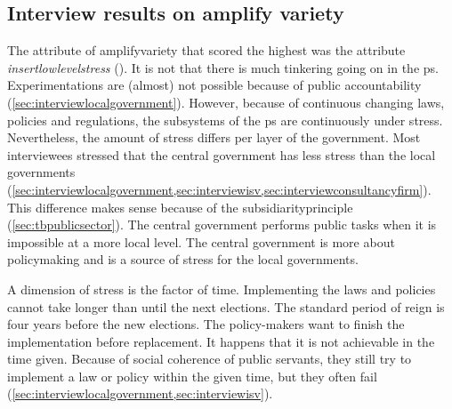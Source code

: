 \subsection{Interview results on amplify variety}
\label{sub:interviewresultsamplify}
The \gls{attribute} of \gls{amplifyvariety} that scored the highest was the \gls{attribute} \textit{\gls{insertlowlevelstress}} (). It is not that there is much tinkering going on in the \gls{ps}. Experimentations are (almost) not possible because of public accountability (\cref{sec:interviewlocalgovernment}). However, because of continuous changing laws, policies and regulations, the subsystems of the \gls{ps} are continuously under stress. Nevertheless, the amount of stress differs per layer of the government. Most interviewees stressed that the central government has less stress than the local governments (\cref{sec:interviewlocalgovernment,sec:interviewisv,sec:interviewconsultancyfirm}). This difference makes sense because of the \gls{subsidiarityprinciple} (\cref{sec:tbpublicsector}). The central government performs public tasks when it is impossible at a more local level. The central government is more about policymaking and is a source of stress for the local governments. 

A dimension of stress is the factor of time. Implementing the laws and policies cannot take longer than until the next elections. The standard period of reign is four years before the new elections. The policy-makers want to finish the implementation before replacement. It happens that it is not achievable in the time given. Because of social coherence of public servants, they still try to implement a law or policy within the given time, but they often fail (\cref{sec:interviewlocalgovernment,sec:interviewisv}).

